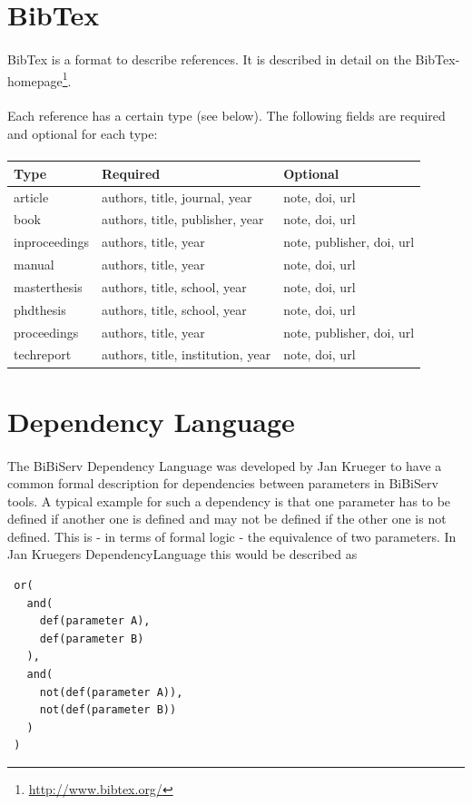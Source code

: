 \documentclass[a4paper,10pt]{book}
\begin{document}
\section{BibTex}
\label{bibTex}
\paragraph{} BibTex is a format to describe references. It is described in detail on the BibTex-homepage\footnote{\url{http://www.bibtex.org/}}.
\paragraph{} Each reference has a certain type (see below). The following fields are required and optional for each type:
\paragraph{}
\begin{tabularx}{\textwidth}{llX}
\hline
\textbf{Type} & \textbf{Required} & \textbf{Optional}\\ [0.1cm]
\hline
article & authors, title, journal, year & note, doi, url\\ [0.1cm]
\hline
book & authors, title, publisher, year & note, doi, url\\ [0.1cm]
\hline
inproceedings & authors, title, year & note, publisher, doi, url\\ [0.1cm]
\hline
manual & authors, title, year & note, doi, url\\ [0.1cm]
\hline
masterthesis & authors, title, school, year & note, doi, url\\ [0.1cm]
\hline
phdthesis & authors, title, school, year & note, doi, url\\ [0.1cm]
\hline
proceedings & authors, title, year & note, publisher, doi, url\\ [0.1cm]
\hline
techreport & authors, title, institution, year & note, doi, url\\ [0.1cm]
\end{tabularx}

\section{Dependency Language}
\label{dependencyLanguage}
\paragraph{} The BiBiServ Dependency Language was developed by Jan Krueger to have a common formal description for dependencies between parameters in BiBiServ tools. A typical example for such a dependency is that one parameter has to be defined if another one is defined and may not be defined if the other one is not defined. This is - in terms of formal logic - the equivalence of two parameters. In Jan Kruegers DependencyLanguage this would be described as
\begin{verbatim}
 or(
   and(
     def(parameter A),
     def(parameter B)
   ),
   and(
     not(def(parameter A)),
     not(def(parameter B))
   )
 )
\end{verbatim}
\end{document}
